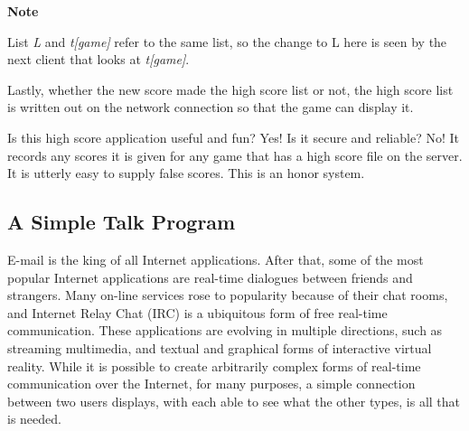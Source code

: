 
{\sffamily\bfseries
Note}

{\sffamily
List \textit{L} and \textit{t[game]} refer to the same list, so the
change to L here is seen by the next client that looks at
\textit{t[game]}.}

Lastly, whether the new score made the high score list or not, the high
score list is written out on the network connection so that the game
can display it.


Is this high score application useful and fun? Yes! Is it secure and
reliable? No! It records any scores it is given for any game that has a
high score file on the server. It is utterly easy to supply false
scores. This is an honor system.

\subsection{A Simple {\textquotedbl}Talk{\textquotedbl} Program}

E-mail is the king of all Internet applications. After that, some of the
most popular Internet applications are real-time dialogues between
friends and strangers. Many on-line services rose to popularity because
of their {\textquotedbl}chat rooms,{\textquotedbl} and Internet Relay
Chat (IRC) is a ubiquitous form of free real-time
communication. These applications are evolving in multiple directions,
such as streaming multimedia, and textual and graphical forms of
interactive virtual reality. While it is possible to create arbitrarily
complex forms of real-time communication over the Internet, for many
purposes, a simple connection between two users{\textquotesingle}
displays, with each able to see what the other types, is all that is
needed.

